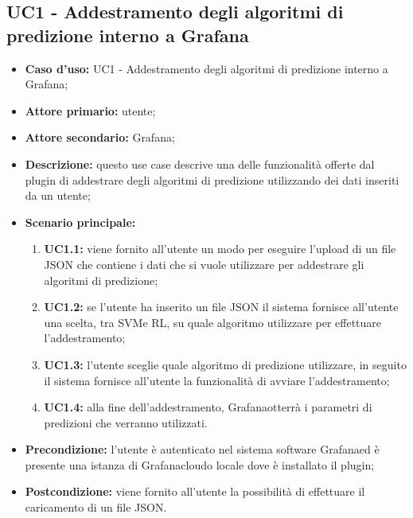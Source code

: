 \documentclass{article}
\begin{document}
	\subsection{UC1 - Addestramento degli algoritmi di predizione interno a Grafana}
	\begin{itemize}
		\item \textbf{Caso d’uso:} UC1 - Addestramento degli algoritmi di predizione interno a Grafana\glo;
		\item \textbf{Attore primario:} utente;
		\item \textbf{Attore secondario:} Grafana\glo;
		\item \textbf{Descrizione:} questo use case descrive una delle funzionalità offerte dal plugin di addestrare degli algoritmi di predizione utilizzando dei dati inseriti da un utente;
		\item \textbf{Scenario principale:} 
			\begin{enumerate}
				\item \textbf{UC1.1:} viene fornito all'utente un modo per eseguire l'upload di un file JSON che contiene i dati che si vuole utilizzare per addestrare gli algoritmi di predizione;
				\item \textbf{UC1.2:} se l'utente ha inserito un file JSON il sistema fornisce all'utente una scelta, tra SVM\glosp e RL\glosp, su quale algoritmo utilizzare per effettuare l'addestramento;
				\item \textbf{UC1.3:} l'utente sceglie quale algoritmo di predizione utilizzare, in seguito il sistema fornisce all'utente la funzionalità di avviare l'addestramento;
				\item \textbf{UC1.4:} alla fine dell'addestramento, Grafana\glosp otterrà i parametri di predizioni che verranno utilizzati.
			\end{enumerate}
		\item \textbf{Precondizione:} l'utente è autenticato nel sistema software Grafana\glosp ed è presente una istanza di Grafana\glosp cloud\glosp o locale dove è installato il plugin;
		\item \textbf{Postcondizione:} viene fornito all'utente la possibilità di effettuare il caricamento di un file JSON.
	\end{itemize}
\end{document}
